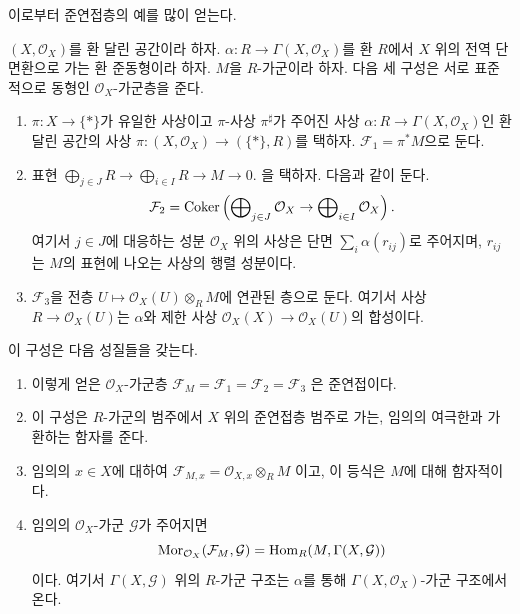 \noindent
이로부터 준연접층의 예를 많이 얻는다.

\begin{lemma}
\label{lemma-construct-quasi-coherent-sheaves}
$(X, \mathcal{O}_X)$를 환 달린 공간이라 하자.
$\alpha : R \to \Gamma(X, \mathcal{O}_X)$를 환 $R$에서
$X$ 위의 전역 단면환으로 가는 환 준동형이라 하자.
$M$을 $R$-가군이라 하자.
다음 세 구성은 서로 표준적으로 동형인 $\mathcal{O}_X$-가군층을 준다.
\begin{enumerate}
\item $\pi : X \to \{*\}$가 유일한 사상이고 $\pi$-사상 $\pi^\sharp$가
주어진 사상 $\alpha : R \to \Gamma(X, \mathcal{O}_X)$인
환 달린 공간의 사상
$\pi : (X, \mathcal{O}_X) \longrightarrow (\{*\}, R)$를 택하자.
$\mathcal{F}_1 = \pi^*M$으로 둔다.
\item 표현
$\bigoplus_{j \in J} R \to \bigoplus_{i \in I} R \to M \to 0$.
을 택하자. 다음과 같이 둔다.
$$
\mathcal{F}_2 = \mathop{\mathrm{Coker}}\left(
\bigoplus\nolimits_{j \in J} \mathcal{O}_X
\to
\bigoplus\nolimits_{i \in I} \mathcal{O}_X
\right).
$$
여기서 $j \in J$에 대응하는 성분 $\mathcal{O}_X$ 위의 사상은
단면 $\sum_i \alpha(r_{ij})$로 주어지며, $r_{ij}$는 $M$의 표현에
나오는 사상의 행렬 성분이다.
\item $\mathcal{F}_3$을 전층
$U \mapsto \mathcal{O}_X(U) \otimes_R M$에 연관된 층으로 둔다.
여기서 사상 $R \to \mathcal{O}_X(U)$는 $\alpha$와 제한 사상
$\mathcal{O}_X(X) \to \mathcal{O}_X(U)$의 합성이다.
\end{enumerate}
이 구성은 다음 성질들을 갖는다.
\begin{enumerate}
\item 이렇게 얻은 $\mathcal{O}_X$-가군층
$\mathcal{F}_M = \mathcal{F}_1 = \mathcal{F}_2 = \mathcal{F}_3$
은 준연접이다.
\item 이 구성은 $R$-가군의 범주에서 $X$ 위의 준연접층 범주로 가는,
임의의 여극한과 가환하는 함자를 준다.
\item 임의의 $x \in X$에 대하여
$\mathcal{F}_{M, x} = \mathcal{O}_{X, x} \otimes_R M$
이고, 이 등식은 $M$에 대해 함자적이다.
\item 임의의 $\mathcal{O}_X$-가군 $\mathcal{G}$가 주어지면
$$
\mathop{\mathrm{Mor}}\nolimits_{\mathcal{O}_X}(\mathcal{F}_M, \mathcal{G})
=
\mathop{\mathrm{Hom}}\nolimits_R(M, \Gamma(X, \mathcal{G}))
$$
이다. 여기서 $\Gamma(X, \mathcal{G})$ 위의 $R$-가군 구조는
$\alpha$를 통해 $\Gamma(X, \mathcal{O}_X)$-가군 구조에서 온다.
\end{enumerate}
\end{lemma}

